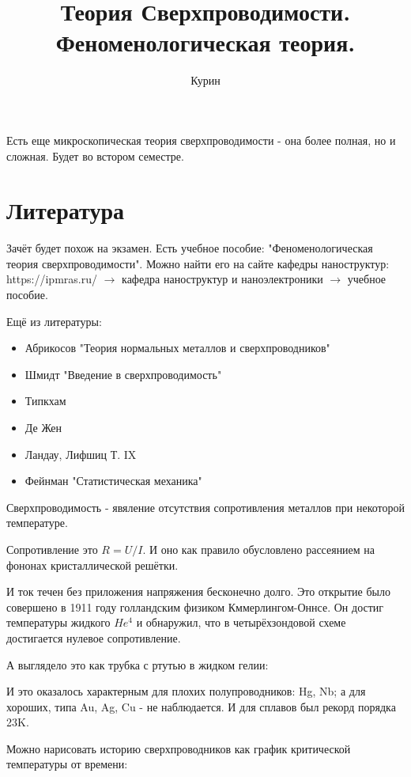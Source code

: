 \documentclass[a4paper, 14pt, russian]{article}
\title{Теория Сверхпроводимости. Феноменологическая теория.}
\author{Курин}
\date{}
\begin{document}
	\maketitle

	Есть еще микроскопическая теория сверхпроводимости - она более полная, но и сложная.
	Будет во встором семестре.

	\section{Литература}

	Зачёт будет похож на экзамен. Есть учебное пособие: "Феноменологическая теория сверхпроводимости".
	Можно найти его на сайте кафедры наноструктур: https://ipmras.ru/ $\rightarrow$ кафедра наноструктур 
	и наноэлектроники $\rightarrow$ учебное пособие.

	Ещё из литературы:
	\begin{itemize}
		\item Абрикосов "Теория нормальных металлов и сверхпроводников"
		\item Шмидт "Введение в сверхпроводимость"
		\item Типкхам
		\item Де Жен
		\item Ландау, Лифшиц Т. IX
		\item Фейнман "Статистическая механика"
	\end{itemize}

	Сверхпроводимость - явяление отсутствия сопротивления металлов при некоторой температуре.


	Сопротивление это $R = U / I$. И оно как правило обусловлено рассеянием на фононах 
	кристаллической решётки. 


	И ток течен без приложения напряжения бесконечно долго. Это открытие было совершено
	в 1911 году голландским физиком Кммерлингом-Оннсе. Он достиг температуры жидкого 
	$He^\text{4}$ и обнаружил, что в четырёхзондовой схеме достигается нулевое сопротивление.


	А выглядело это как трубка с ртутью в жидком гелии: 


	И это оказалось характерным для плохих полупроводников: Hg, Nb; а 
	для хороших, типа Au, Ag, Cu  - не наблюдается. И для сплавов был
	рекорд порядка 23K.

	Можно нарисовать историю сверхпроводников как график критической 
	температуры от времени:
\end{document}
